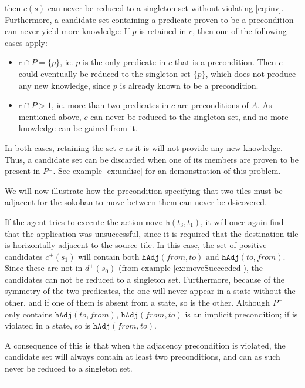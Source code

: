 \documentclass[../../Master.tex]{subfiles}
\begin{document}
then $c(s)$ can never be reduced to a singleton set without violating \eqref{eq:inv}. Furthermore, a candidate set containing a predicate proven to be a precondition can never yield more knowledge: If $p$ is retained in $c$, then one of the following cases apply:
\begin{itemize}
    \item $c \cap P = \{ p \}$, ie. $p$ is the only predicate in $c$ that is a precondition. Then $c$ could eventually be reduced to the singleton set $\{ p \}$, which does not produce any new knowledge, since $p$ is already known to be a precondition.

    \item $c \cap P > 1$, ie. more than two predicates in $c$ are preconditions of $A$. As mentioned above, $c$ can never be reduced to the singleton set, and no more knowledge can be gained from it.
\end{itemize}
In both cases, retaining the set $c$ as it is will not provide any new knowledge. Thus, a candidate set can be discarded when one of its members are proven to be present in $P^{\pm}$. See example \ref{ex:undisc} for an demonstration of this problem.

\begin{example} \label{ex:undisc}
    We will now illustrate how the precondition specifying that two tiles must be adjacent for the sokoban to move between them can never be dsicovered.

    If the agent tries to execute the action $\texttt{move-h}(t_3, t_1)$, it will once again find that the application was unsuccessful, since it is required that the destination tile is horizontally adjacent to the source tile. In this case, the set of positive candidates $c^+(s_1)$ will contain both $\texttt{hAdj}(from, to)$ and $\texttt{hAdj}(to, from)$. Since these are not in $d^+(s_0)$ (from example \ref{ex:moveSucceeded}), the candidates can not be reduced to a singleton set. Furthermore, because of the symmetry of the two predicates, the one will never appear in a state without the other, and if one of them is absent from a state, so is the other. Although $P^+$ only contains $\texttt{hAdj}(to, from)$, $\texttt{hAdj}(from, to)$ is an implicit precondition; if is violated in a state, so is $\texttt{hAdj}(from, to)$.

    A consequence of this is that when the adjacency precondition is violated, the candidate set will always contain at least two preconditions, and can as such never be reduced to a singleton set.

    \noindent\rule{\textwidth}{1pt}
\end{example}
\end{document}
